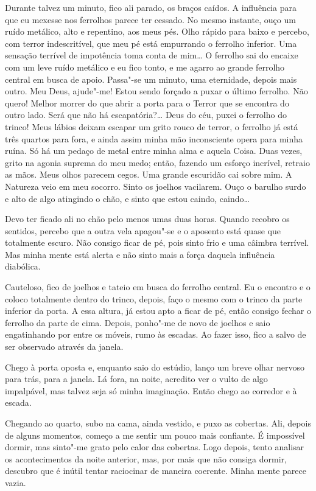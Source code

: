Durante talvez um minuto, fico ali parado, os braços caídos. A influência para que eu mexesse nos ferrolhos parece ter
cessado. No mesmo instante, ouço um ruído metálico, alto e repentino, aos meus pés. Olho rápido para baixo e percebo,
com terror indescritível, que meu pé está empurrando o ferrolho inferior. Uma sensação terrível de impotência toma
conta de mim\ldots{} O ferrolho sai do encaixe com um leve ruído metálico e eu fico tonto, e me agarro ao grande ferrolho
central em busca de apoio. Passa"-se um minuto, uma eternidade, depois mais outro. Meu Deus, ajude"-me! Estou sendo
forçado a puxar o último ferrolho. Não quero! Melhor morrer do que abrir a porta para o Terror que se encontra do outro
lado. Será que não há escapatória?\ldots{} Deus do céu, puxei o ferrolho do trinco! Meus lábios deixam escapar um grito
rouco de terror, o ferrolho já está três quartos para fora, e ainda assim minha mão inconsciente opera para minha
ruína. Só há um pedaço de metal entre minha alma e aquela Coisa. Duas vezes, grito na agonia suprema do meu medo;
então, fazendo um esforço incrível, retraio as mãos. Meus olhos parecem cegos. Uma grande escuridão cai sobre mim. A
Natureza veio em meu socorro. Sinto os joelhos vacilarem. Ouço o barulho surdo e alto de algo atingindo o chão, e sinto
que estou caindo, caindo\ldots{}

Devo ter ficado ali no chão pelo menos umas duas horas. Quando recobro os sentidos, percebo que a outra vela apagou"-se
e o aposento está quase que totalmente escuro. Não consigo ficar de pé, pois sinto frio e uma câimbra terrível. Mas
minha mente está alerta e não sinto mais a força daquela influência diabólica.

Cauteloso, fico de joelhos e tateio em busca do ferrolho central. Eu o encontro e o coloco totalmente dentro do
trinco, depois, faço o mesmo com o trinco da parte inferior da porta. A essa altura, já estou apto a ficar de pé, então
consigo fechar o ferrolho da parte de cima. Depois, ponho"-me de novo de joelhos e saio engatinhando por entre os
móveis, rumo às escadas. Ao fazer isso, fico a salvo de ser observado através da janela.

Chego à porta oposta e, enquanto saio do estúdio, lanço um breve olhar nervoso para trás, para a janela. Lá fora, na
noite, acredito ver o vulto de algo impalpável, mas talvez seja só minha imaginação. Então chego ao corredor e à
escada.

Chegando ao quarto, subo na cama, ainda vestido, e puxo as cobertas. Ali, depois de alguns momentos, começo a me sentir
um pouco mais confiante. É impossível dormir, mas sinto"-me grato pelo calor das cobertas. Logo depois, tento analisar
os acontecimentos da noite anterior, mas, por mais que não consiga dormir, descubro que é inútil tentar raciocinar de
maneira coerente. Minha mente parece vazia.

